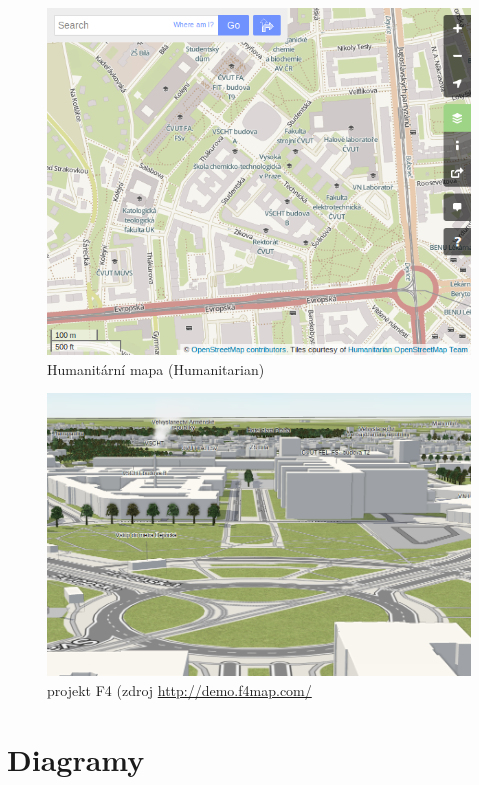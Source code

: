 \begin{figure}[H]
    \centering
    \includegraphics[width=11.5cm]{pictures/osm_humanitarian.png} 
    \caption{Humanitární mapa (Humanitarian)}
    \label{fig:humanitarian}
\end{figure}

\begin{figure}[H]
    \centering
    \includegraphics[width=11.5cm]{pictures/F4.png} 
    \caption{projekt F4 (zdroj \url{http://demo.f4map.com/}}
    \label{fig:F4}
\end{figure}


\chapter{Diagramy}
\label{digramy}

